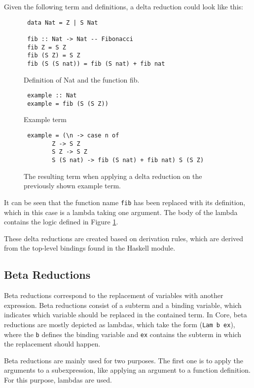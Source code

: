 Given the following term and definitions, a delta reduction could look like this:

\begin{figure}[!ht]
\begin{verbatim}
 data Nat = Z | S Nat

 fib :: Nat -> Nat -- Fibonacci
 fib Z = S Z
 fib (S Z) = S Z
 fib (S (S nat)) = fib (S nat) + fib nat
\end{verbatim}
    \caption{Definition of Nat and the function fib.}
    \label{fig:deltaReductionExample}
\end{figure}

\begin{figure}[!ht]
\begin{verbatim}
 example :: Nat
 example = fib (S (S Z))
\end{verbatim}
    \caption{Example term}
\end{figure}

\begin{figure}[!ht]
\begin{verbatim}
 example = (\n -> case n of
        Z -> S Z
        S Z -> S Z
        S (S nat) -> fib (S nat) + fib nat) S (S Z)
\end{verbatim}
    \caption{The resulting term when applying a delta reduction on the previously shown example term.}
\end{figure}

It can be seen that the function name \texttt{fib} has been replaced with its definition,
which in this case is a lambda taking one argument.
The body of the lambda contains the logic defined in Figure \ref*{fig:deltaReductionExample}.

These delta reductions are created based on derivation rules,
which are derived from the top-level bindings found in the Haskell module.

\subsection{Beta Reductions}
Beta reductions correspond to the replacement of variables with another expression.
Beta reductions consist of a subterm and a binding variable,
which indicates which variable should be replaced in the contained term.
In Core, beta reductions are mostly depicted as lambdas,
which take the form (\texttt{Lam b ex}),
where the \texttt{b} defines the binding variable and \texttt{ex} contains the subterm in which the replacement should happen.

Beta reductions are mainly used for two purposes.
The first one is to apply the arguments to a subexpression,
like applying an argument to a function definition.
For this purpose, lambdas are used.

